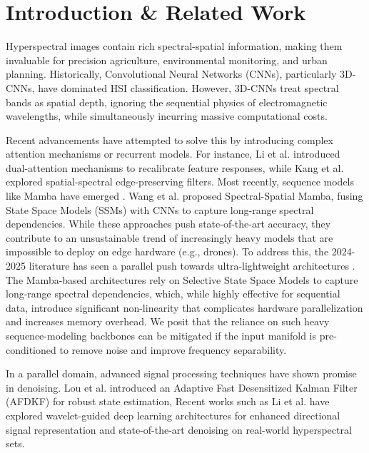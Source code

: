 \documentclass[pdflatex,sn-mathphys-num,iicol]{sn-jnl}
\begin{document}
\maketitle


\section{Introduction \& Related Work}\label{sec:introduction}

Hyperspectral images contain rich spectral-spatial information, making them invaluable for precision agriculture, environmental monitoring, and urban planning. Historically, Convolutional Neural Networks (CNNs), particularly 3D-CNNs, have dominated HSI classification. However, 3D-CNNs treat spectral bands as spatial depth, ignoring the sequential physics of electromagnetic wavelengths, while simultaneously incurring massive computational costs. 

Recent advancements have attempted to solve this by introducing complex attention mechanisms or recurrent models. For instance, Li et al. \cite{yan2021} introduced dual-attention mechanisms to recalibrate feature responses, while Kang et al. \cite{kang2014} explored spatial-spectral edge-preserving filters. Most recently, sequence models like Mamba have emerged \cite{zhang2024, hypermamba2024}. Wang et al. \cite{zhang2024} proposed Spectral-Spatial Mamba, fusing State Space Models (SSMs) with CNNs to capture long-range spectral dependencies. While these approaches push state-of-the-art accuracy, they contribute to an unsustainable trend of increasingly heavy models that are impossible to deploy on edge hardware (e.g., drones). To address this, the 2024-2025 literature has seen a parallel push towards ultra-lightweight architectures \cite{scnet2025}. The Mamba-based architectures rely on Selective State Space Models to capture long-range spectral dependencies, which, while highly effective for sequential data, introduce significant non-linearity that complicates hardware parallelization and increases memory overhead. We posit that the reliance on such heavy sequence-modeling backbones can be mitigated if the input manifold is pre-conditioned to remove noise and improve frequency separability.

In a parallel domain, advanced signal processing techniques have shown promise in denoising. Lou et al. \cite{lou2024} introduced an Adaptive Fast Desensitized Kalman Filter (AFDKF) for robust state estimation, Recent works such as Li et al. \cite{waveletdenoise2024} have explored wavelet-guided deep learning architectures for enhanced directional signal representation and state-of-the-art denoising on real-world hyperspectral sets. 
\end{document}
